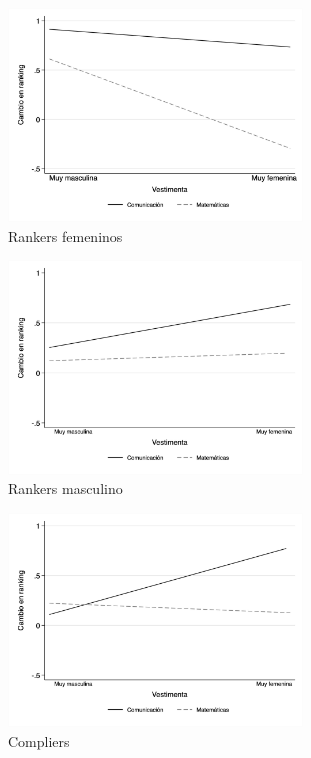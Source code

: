 \begin{figure}[t!]
\begin{minipage}{0.245\textwidth}
    \end{minipage}
    \centering
    \begin{subfigure}[t]{0.49\textwidth}
        \centering
        \caption{Rankers femeninos}
        \includegraphics[width=7.8cm]{Images/h2_predicted_rank_score_fem.png}
    \end{subfigure}
    \begin{subfigure}[t]{0.49\textwidth}
        \centering
        \caption{Rankers masculino}
        \includegraphics[width=7.8cm]{Images/h2_predicted_rank_score_masc.png}
    \end{subfigure}
    \begin{subfigure}[t]{0.49\textwidth}
        \centering
        \caption{Compliers}
        \includegraphics[width=7.8cm]{Images/h3_predicted_rank_score_complier.png}
    \end{subfigure}
    \begin{subfigure}[t]{0.49\textwidth}

\end{subfigure}
\end{figure}
